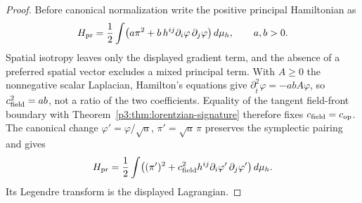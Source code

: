 \documentclass[12pt,a4paper]{article}
\begin{document}
\begin{proof}
Before canonical normalization write the positive principal Hamiltonian as
\[
H_{\rm pr}
=\frac12\int\!\left(
a\pi^2+b\,h^{ij}\partial_i\varphi\,\partial_j\varphi
\right)d\mu_h,
\qquad a,b>0.
\]
Spatial isotropy leaves only the displayed gradient term, and the absence of
a preferred spatial vector excludes a mixed principal term.  With
\(A\ge0\) the nonnegative scalar Laplacian, Hamilton's equations give
\(\partial_{\widetilde t}^2\varphi=-abA\varphi\), so
\(c_{\rm field}^2=ab\), not a ratio of the two coefficients.
Equality of the tangent field-front boundary with
Theorem~\ref{p3:thm:lorentzian-signature} therefore fixes
\(c_{\rm field}=c_{\rm op}\).
The canonical change
\(\varphi'=\varphi/\sqrt a\), \(\pi'=\sqrt a\,\pi\) preserves the symplectic
pairing and gives
\[
H_{\rm pr}
=\frac12\int\!\left(
(\pi')^2+c_{\rm field}^2h^{ij}\partial_i\varphi'\,\partial_j\varphi'
\right)d\mu_h.
\]
Its Legendre transform is the displayed Lagrangian.
\end{proof}
\end{document}
